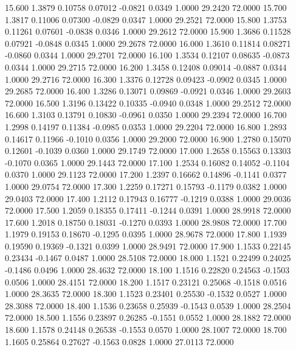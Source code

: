   15.600   1.3879   0.10758   0.07012  -0.0821   0.0349   1.0000  29.2420  72.0000
  15.700   1.3817   0.11006   0.07300  -0.0829   0.0347   1.0000  29.2521  72.0000
  15.800   1.3753   0.11261   0.07601  -0.0838   0.0346   1.0000  29.2612  72.0000
  15.900   1.3686   0.11528   0.07921  -0.0848   0.0345   1.0000  29.2678  72.0000
  16.000   1.3610   0.11814   0.08271  -0.0860   0.0344   1.0000  29.2701  72.0000
  16.100   1.3534   0.12107   0.08635  -0.0873   0.0344   1.0000  29.2715  72.0000
  16.200   1.3458   0.12408   0.09014  -0.0887   0.0344   1.0000  29.2716  72.0000
  16.300   1.3376   0.12728   0.09423  -0.0902   0.0345   1.0000  29.2685  72.0000
  16.400   1.3286   0.13071   0.09869  -0.0921   0.0346   1.0000  29.2603  72.0000
  16.500   1.3196   0.13422   0.10335  -0.0940   0.0348   1.0000  29.2512  72.0000
  16.600   1.3103   0.13791   0.10830  -0.0961   0.0350   1.0000  29.2394  72.0000
  16.700   1.2998   0.14197   0.11384  -0.0985   0.0353   1.0000  29.2204  72.0000
  16.800   1.2893   0.14617   0.11966  -0.1010   0.0356   1.0000  29.2000  72.0000
  16.900   1.2780   0.15070   0.12601  -0.1039   0.0360   1.0000  29.1749  72.0000
  17.000   1.2658   0.15563   0.13303  -0.1070   0.0365   1.0000  29.1443  72.0000
  17.100   1.2534   0.16082   0.14052  -0.1104   0.0370   1.0000  29.1123  72.0000
  17.200   1.2397   0.16662   0.14896  -0.1141   0.0377   1.0000  29.0754  72.0000
  17.300   1.2259   0.17271   0.15793  -0.1179   0.0382   1.0000  29.0403  72.0000
  17.400   1.2112   0.17943   0.16777  -0.1219   0.0388   1.0000  29.0036  72.0000
  17.500   1.2059   0.18355   0.17411  -0.1244   0.0391   1.0000  28.9918  72.0000
  17.600   1.2018   0.18750   0.18031  -0.1270   0.0393   1.0000  28.9808  72.0000
  17.700   1.1979   0.19153   0.18670  -0.1295   0.0395   1.0000  28.9678  72.0000
  17.800   1.1939   0.19590   0.19369  -0.1321   0.0399   1.0000  28.9491  72.0000
  17.900   1.1533   0.22145   0.23434  -0.1467   0.0487   1.0000  28.5108  72.0000
  18.000   1.1521   0.22499   0.24025  -0.1486   0.0496   1.0000  28.4632  72.0000
  18.100   1.1516   0.22820   0.24563  -0.1503   0.0506   1.0000  28.4151  72.0000
  18.200   1.1517   0.23121   0.25068  -0.1518   0.0516   1.0000  28.3635  72.0000
  18.300   1.1523   0.23401   0.25530  -0.1532   0.0527   1.0000  28.3088  72.0000
  18.400   1.1536   0.23658   0.25939  -0.1543   0.0539   1.0000  28.2504  72.0000
  18.500   1.1556   0.23897   0.26285  -0.1551   0.0552   1.0000  28.1882  72.0000
  18.600   1.1578   0.24148   0.26538  -0.1553   0.0570   1.0000  28.1007  72.0000
  18.700   1.1605   0.25864   0.27627  -0.1563   0.0828   1.0000  27.0113  72.0000
